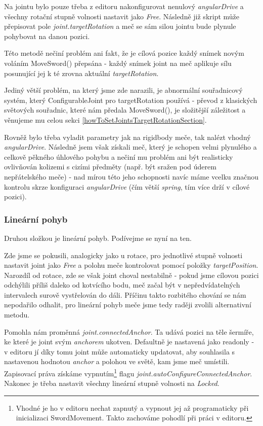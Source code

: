 Na jointu bylo pouze třeba z editoru nakonfigurovat nenulový \textit{angularDrive} a všechny rotační stupně volnosti nastavit jako \textit{Free}. Následně již skript může přepisovat pole \textit{joint.targetRotation} a meč se sám silou jointu bude plynule pohybovat na danou pozici.

Této metodě nečiní problém ani fakt, že je cílová pozice každý snímek novým voláním MoveSword() přepsána - každý snímek joint na meč aplikuje sílu posunující jej k té zrovna aktuální \textit{targetRotation}. 

Jediný větší problém, na který jsme zde narazili, je abnormální souřadnicový systém, který ConfigurableJoint pro targetRotation používá - převod z klasických světových souřadnic, které nám předala MoveSword(), je složitější záležitost a věnujeme mu celou sekci \ref{howToSetJointsTargetRotationSection}. 

Rovněž bylo třeba vyladit parametry jak na rigidbody meče, tak nalézt vhodný \textit{angularDrive}. Následně jsem však získali meč, který je schopen velmi plynulého a celkově pěkného úhlového pohybu a nečiní mu problém ani být realisticky ovlivňován kolizemi s cizími předměty (např. být sražen pod úderem nepřátelského meče) - nad mírou této jeho schopnosti navíc máme vcelku značnou kontrolu skrze konfiguraci \textit{angularDrive} (čím větší \textit{spring}, tím více drží v cílové pozici).

\subsubsection*{Lineární pohyb}

Druhou složkou je lineární pohyb. Podívejme se nyní na ten.

Zde jsme se pokusili, analogicky jako u rotace, pro jednotlivé stupně volnosti nastavit joint jako \textit{Free} a polohu meče kontrolovat pomocí položky \textit{targetPosition}. Narozdíl od rotace, zde se však joint choval nestabilně - pokud jsme cílovou pozici odchýlili příliš daleko od kotvícího bodu, meč začal být v nepředvídatelných intervalech surově vystřelován do dáli. Příčinu takto rozbitého chování se nám nepodařilo odhalit, pro lineární pohyb meče jsme tedy raději zvolili alternativní metodu. 

Pomohla nám proměnná \textit{joint.connectedAnchor}. Ta udává pozici na těle šermíře, ke které je joint svým \textit{anchorem} ukotven. Defaultně je nastavená jako readonly - v editoru jí díky tomu joint může automaticky updatovat, aby souhlasila s nastavenou hodnotou \textit{anchor} a polohou ve světě, kam jsme meč umístili. Zapisovací práva získáme vypnutím\footnote{Vhodné je ho v editoru nechat zapnutý a vypnout jej až programaticky při inicializaci SwordMovement. Takto zachováme pohodlí při práci v editoru.} flagu \textit{joint.autoConfigureConnectedAnchor}. Nakonec je třeba nastavit všechny lineární stupně volnosti na \textit{Locked}.

